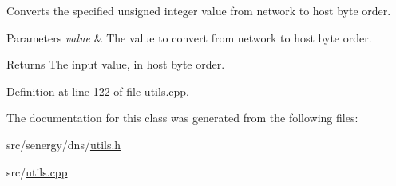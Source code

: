 Converts the specified unsigned integer value from network to host byte order. 


\begin{DoxyParams}{Parameters}
{\em value} & The value to convert from network to host byte order.\\
\hline
\end{DoxyParams}
\begin{DoxyReturn}{Returns}
The input value, in host byte order. 
\end{DoxyReturn}


Definition at line 122 of file utils.\-cpp.



The documentation for this class was generated from the following files\-:\begin{DoxyCompactItemize}
\item 
src/senergy/dns/\hyperlink{utils_8h}{utils.\-h}\item 
src/\hyperlink{utils_8cpp}{utils.\-cpp}\end{DoxyCompactItemize}
